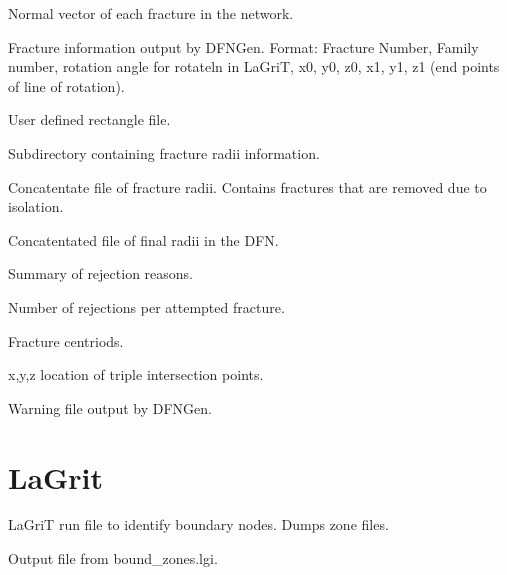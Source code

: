 \documentclass[letterpaper,10pt,english]{sphinxmanual}
\begin{document}
\label{\detokenize{output:normal-vectors-dat}}
Normal vector of each fracture in the network.

\label{\detokenize{output:poly-info-dat}}
Fracture information output by DFNGen. Format: Fracture Number, Family number, rotation angle for rotateln in LaGriT, x0, y0, z0, x1, y1, z1 (end points of line of rotation).

\label{\detokenize{output:user-rects-dat}}
User defined rectangle file.

\label{\detokenize{output:radii}}
Subdirectory containing fracture radii information.

\label{\detokenize{output:radii-dat}}
Concatentate file of fracture radii. Contains fractures that are removed due to isolation.

\label{\detokenize{output:radii-final-dat}}
Concatentated file of final radii in the DFN.

\label{\detokenize{output:rejections-dat}}
Summary of rejection reasons.

\label{\detokenize{output:rejectsperattempt-dat}}
Number of rejections per attempted fracture.

\label{\detokenize{output:translations-dat}}
Fracture centriods.

\label{\detokenize{output:triple-points-dat}}
x,y,z location of triple intersection points.

\label{\detokenize{output:warningfiledfngen-txt}}
Warning file output by DFNGen.


\section{LaGrit}
\label{\detokenize{output:id2}}
\label{\detokenize{output:bound-zones-lgi}}
LaGriT run file to identify boundary nodes. Dumps zone files.

\label{\detokenize{output:boundary-output-txt}}
Output file from bound\_zones.lgi.
\end{document}

